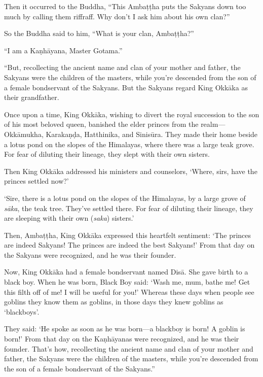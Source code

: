 \documentclass[12pt,openany]{book}%
\begin{document}
Then it occurred to the Buddha, “This \textsanskrit{Ambaṭṭha} puts the Sakyans down too much by calling them riffraff. Why don’t I ask him about his own clan?” 

So the Buddha said to him, “What is your clan, \textsanskrit{Ambaṭṭha}?” 

“I am a \textsanskrit{Kaṇhāyana}, Master Gotama.” 

“But, recollecting the ancient name and clan of your mother and father, the Sakyans were the children of the masters, while you’re descended from the son of a female bondservant of the Sakyans. But the Sakyans regard King \textsanskrit{Okkāka} as their grandfather. 

Once upon a time, King \textsanskrit{Okkāka}, wishing to divert the royal succession to the son of his most beloved queen, banished the elder princes from the realm—\textsanskrit{Okkāmukha}, \textsanskrit{Karakaṇḍa}, Hatthinika, and \textsanskrit{Sinisūra}. They made their home beside a lotus pond on the slopes of the Himalayas, where there was a large teak grove. For fear of diluting their lineage, they slept with their own sisters. 

Then King \textsanskrit{Okkāka} addressed his ministers and counselors, ‘Where, sirs, have the princes settled now?’ 

‘Sire, there is a lotus pond on the slopes of the Himalayas, by a large grove of \textit{\textsanskrit{sāka}}, the teak tree. They’ve settled there. For fear of diluting their lineage, they are sleeping with their own (\textit{saka}) sisters.’ 

Then, \textsanskrit{Ambaṭṭha}, King \textsanskrit{Okkāka} expressed this heartfelt sentiment: ‘The princes are indeed Sakyans! The princes are indeed the best Sakyans!’ From that day on the Sakyans were recognized, and he was their founder. 

Now, King \textsanskrit{Okkāka} had a female bondservant named \textsanskrit{Disā}. She gave birth to a black boy. When he was born, Black Boy said: ‘Wash me, mum, bathe me! Get this filth off of me! I will be useful for you!’ Whereas these days when people see goblins they know them as goblins, in those days they knew goblins as ‘blackboys’. 

They said: ‘He spoke as soon as he was born—a blackboy is born! A goblin is born!’ From that day on the \textsanskrit{Kaṇhāyanas} were recognized, and he was their founder. That’s how, recollecting the ancient name and clan of your mother and father, the Sakyans were the children of the masters, while you’re descended from the son of a female bondservant of the Sakyans.” 
\end{document}
